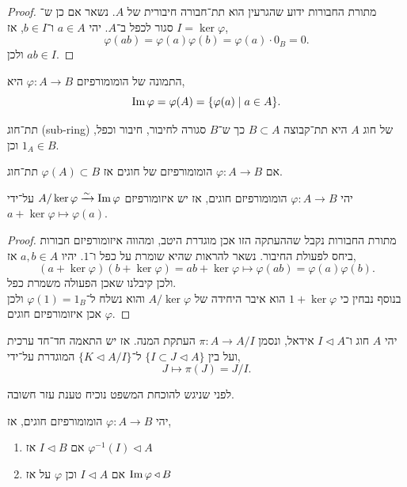\begin{proof}
	מתורת החבורות ידוע שהגרעין הוא תת־חבורה חיבורית של $A$.
	נשאר אם כן ש־$I = \ker \varphi$ סגור לכפל ב־$A$.
	יהי $a \in A$ ו־$b \in I$, אז,
	\[
		\varphi(a b)
		= \varphi(a) \varphi(b)
		= \varphi(a) \cdot 0_B
		= 0
	.\]
	ולכן $a b \in I$.
\end{proof}
\begin{definition}[תמונה]
	התמונה של הומומורפיזם $\varphi : A \to B$ היא,
	\[
		\operatorname{Im} \varphi
		= \varphi(A)
		= \{ \varphi(a) \mid a \in A \}
	.\]
\end{definition}
\begin{definition}[תת־חוג]
	תת־חוג (sub-ring) של חוג $A$ היא תת־קבוצה $B \subset A$ כך ש־$B$ סגורה לחיבור, חיבור וכפל, וכן $1_A \in B$.
\end{definition}
\begin{exercise}
	אם $\varphi : A \to B$ הומומורפיזם של חוגים אז $\varphi(A) \subset B$ תת־חוג.
\end{exercise}
\begin{theorem}
	יהי $\varphi : A \to B$ הומומורפיזם חוגים, אז יש איזומורפיזם $A / \ker \varphi \xrightarrow{\sim} \operatorname{Im} \varphi$ על־ידי $a + \ker \varphi \mapsto \varphi(a)$.
\end{theorem}
\begin{proof}
	מתורת החבורות נקבל שההעתקה הזו אכן מוגדרת היטב, ומהווה איזומורפיזם חבורות ביחס לפעולת החיבור.
	נשאר להראות שהיא שומרת על כפל ו־$1$.
	יהיו $a, b \in A$ אז,
	\[
		(a + \ker \varphi) (b + \ker \varphi)
		= a b + \ker \varphi
		\mapsto \varphi(a b)
		= \varphi(a) \varphi(b)
	.\]
	ולכן קיבלנו שאכן הפעולה משמרת כפל. \\
	בנוסף נבחין כי $1 + \ker \varphi$ הוא איבר היחידה של $A / \ker \varphi$ והוא נשלח ל־$\varphi(1) = 1_B$ ולכן $\varphi$ אכן איזומורפיזם חוגים.
\end{proof}
\begin{theorem}
	יהי $A$ חוג ו־$I \triangleleft A$ אידאל, ונסמן $\pi : A \to A / I$ העתקת המנה.
	אז יש התאמה חד־חד ערכית ועל בין $\{ I \subset J \triangleleft A \}$ ל־$\{ K \triangleleft A / I \}$ המוגדרת על־ידי,
	\[
		J \mapsto \pi(J)
		= J / I
	.\]
\end{theorem}
לפני שניגש להוכחת המשפט נוכיח טענת עזר חשובה.
\begin{lemma}
	יהי $\varphi : A \to B$ הומומורפיזם חוגים, אז,
	\begin{enumerate}
		\item אם $I \triangleleft B$ אז $\varphi^{-1}(I) \triangleleft A$
		\item אם $I \triangleleft A$ וכן $\varphi$ על אז $\operatorname{Im} \varphi \triangleleft B$
	\end{enumerate}
\end{lemma}

